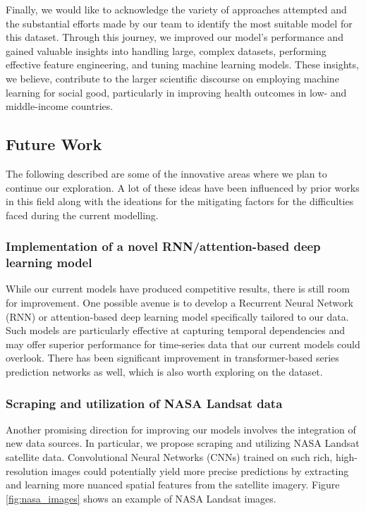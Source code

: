 \documentclass{article}
\begin{document}
Finally, we would like to acknowledge the variety of approaches attempted and the substantial efforts made by our team to identify the most suitable model for this dataset. Through this journey, we improved our model's performance and gained valuable insights into handling large, complex datasets, performing effective feature engineering, and tuning machine learning models. These insights, we believe, contribute to the larger scientific discourse on employing machine learning for social good, particularly in improving health outcomes in low- and middle-income countries.


\subsection{Future Work}

The following described are some of the innovative areas where we plan to continue our exploration. A lot of these ideas have been influenced by prior works in this field along with the ideations for the mitigating factors for the difficulties faced during the current modelling.

\subsubsection{Implementation of a novel RNN/attention-based deep learning model} 
    
While our current models have produced competitive results, there is still room for improvement. One possible avenue is to develop a Recurrent Neural Network (RNN) or attention-based deep learning model specifically tailored to our data. Such models are particularly effective at capturing temporal dependencies and may offer superior performance for time-series data that our current models could overlook. There has been significant improvement in transformer-based series prediction networks as well, which is also worth exploring on the dataset.
    
\subsubsection{Scraping and utilization of NASA Landsat data} 

Another promising direction for improving our models involves the integration of new data sources. In particular, we propose scraping and utilizing NASA Landsat satellite data. Convolutional Neural Networks (CNNs) trained on such rich, high-resolution images could potentially yield more precise predictions by extracting and learning more nuanced spatial features from the satellite imagery. Figure \ref{fig:nasa_images} shows an example of NASA Landsat images.
    
\end{document}
